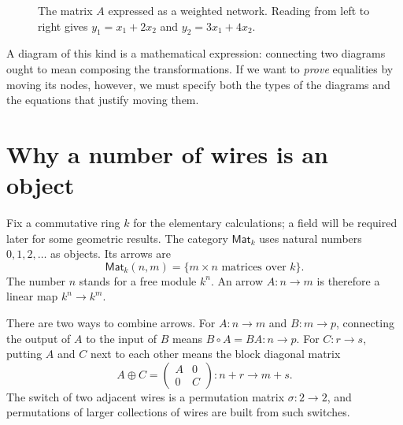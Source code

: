 \begin{figure}[H]
\centering
{}
\caption{The matrix \(A\) expressed as a weighted network. Reading from left to right gives \(y_1=x_1+2x_2\) and \(y_2=3x_1+4x_2\).}
\end{figure}

A diagram of this kind is a mathematical expression: connecting two diagrams ought to mean composing the transformations. If we want to \emph{prove} equalities by moving its nodes, however, we must specify both the types of the diagrams and the equations that justify moving them.

\section{Why a number of wires is an object}

Fix a commutative ring \(k\) for the elementary calculations; a field will be required later for some geometric results. The category \(\mathsf{Mat}_k\) uses natural numbers \(0,1,2,\ldots\) as objects. Its arrows are
\[
 \mathsf{Mat}_k(n,m)=\{m\times n\text{ matrices over }k\}.
\]
The number \(n\) stands for a free module \(k^n\). An arrow \(A:n\to m\) is therefore a linear map \(k^n\to k^m\).

There are two ways to combine arrows. For \(A:n\to m\) and \(B:m\to p\), connecting the output of \(A\) to the input of \(B\) means \(B\circ A=BA:n\to p\). For \(C:r\to s\), putting \(A\) and \(C\) next to each other means the block diagonal matrix
\[
 A\oplus C=
 \begin{pmatrix}A&0\\0&C\end{pmatrix}:n+r\to m+s.
\]
The switch of two adjacent wires is a permutation matrix \(\sigma:2\to2\), and permutations of larger collections of wires are built from such switches.

